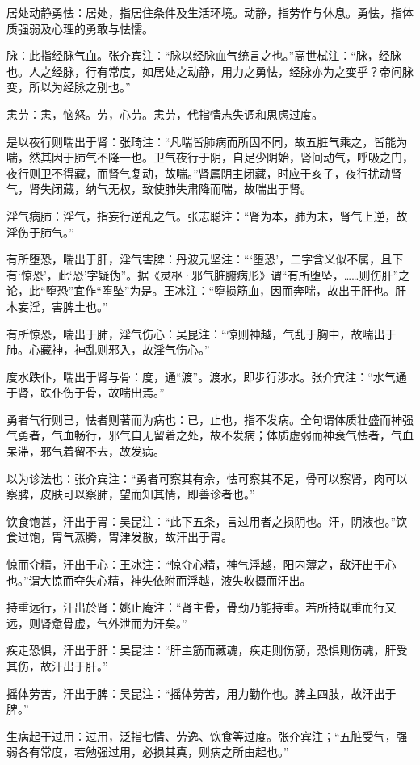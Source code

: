 \documentclass[12pt]{ctexbook}
\begin{document}
\begin{jiaozhu}
  \item 居处动静勇怯：居处，指居住条件及生活环境。动静，指劳作与休息。勇怯，指体质强弱及心理的勇敢与怯懦。
  \item 脉：此指经脉气血。张介宾注：“脉以经脉血气统言之也。”高世栻注：“脉，经脉也。人之经脉，行有常度，如居处之动静，用力之勇怯，经脉亦为之变乎？帝问脉变，所以为经脉之别也。”
  \item 恚劳：恚，恼怒。劳，心劳。恚劳，代指情志失调和思虑过度。
  \item 是以夜行则喘出于肾：张琦注：“凡喘皆肺病而所因不同，故五脏气乘之，皆能为喘，然其因于肺气不降一也。卫气夜行于阴，自足少阴始，肾间动气，呼吸之门，夜行则卫不得藏，而肾气复动，故喘。”肾属阴主闭藏，时应于亥子，夜行扰动肾气，肾失闭藏，纳气无权，致使肺失肃降而喘，故喘出于肾。
  \item 淫气病肺：淫气，指妄行逆乱之气。张志聪注：“肾为本，肺为末，肾气上逆，故淫伤于肺气。”
  \item 有所堕恐，喘出于肝，淫气害脾：丹波元坚注：“‘堕恐’，二字含义似不属，且下有‘惊恐'，此‘恐’字疑伪”。据《灵枢·邪气脏腑病形》谓“有所堕坠，……则伤肝”之论，此“堕恐”宜作“堕坠”为是。王冰注：“堕损筋血，因而奔喘，故出于肝也。肝木妄淫，害脾土也。”
  \item 有所惊恐，喘出于肺，淫气伤心：吴昆注：“惊则神越，气乱于胸中，故喘出于肺。心藏神，神乱则邪入，故淫气伤心。”
  \item 度水跌仆，喘出于肾与骨：度，通“渡”。渡水，即步行涉水。张介宾注：“水气通于肾，跌仆伤于骨，故喘出焉。”
  \item 勇者气行则已，怯者则著而为病也：已，止也，指不发病。全句谓体质壮盛而神强气勇者，气血畅行，邪气自无留着之处，故不发病；体质虚弱而神衰气怯者，气血呆滞，邪气着留不去，故发病。
  \item 以为诊法也：张介宾注：“勇者可察其有佘，怯可察其不足，骨可以察肾，肉可以察脾，皮肤可以察肺，望而知其情，即善诊者也。”
  \item 饮食饱甚，汗出于胃：吴昆注：“此下五条，言过用者之损阴也。汗，阴液也。”饮食过饱，胃气蒸腾，胃津发散，故汗出于胃。
  \item 惊而夺精，汗出于心：王冰注：“惊夺心精，神气浮越，阳内薄之，敌汗出于心也。”谓大惊而夺失心精，神失依附而浮越，液失收摄而汗出。
  \item 持重远行，汗出於肾：姚止庵注：“肾主骨，骨劲乃能持重。若所持既重而行又远，则肾惫骨虚，气外泄而为汗矣。”
  \item 疾走恐惧，汗出于肝：吴昆注：“肝主筋而藏魂，疾走则伤筋，恐惧则伤魂，肝受其伤，故汗出于肝。”
  \item 摇体劳苦，汗出于脾：吴昆注：“摇体劳苦，用力勤作也。脾主四肢，故汗出于脾。”
  \item 生病起于过用：过用，泛指七情、劳逸、饮食等过度。张介宾注；“五脏受气，强弱各有常度，若勉强过用，必损其真，则病之所由起也。”
\end{jiaozhu}
\end{document}
